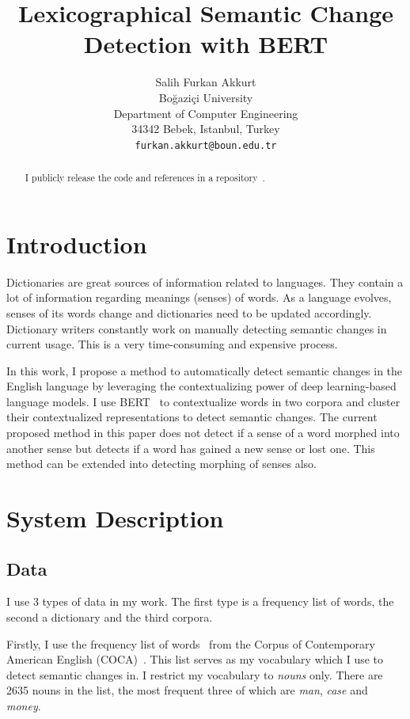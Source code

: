 \documentclass[11pt]{article}
\title{Lexicographical Semantic Change Detection with BERT}
\author{Salih Furkan Akkurt \\
  Boğaziçi University \\
  Department of Computer Engineering \\
  34342 Bebek, Istanbul, Turkey \\
  {\tt furkan.akkurt@boun.edu.tr}
}
\date{}
\begin{document}
\maketitle
\begin{abstract}
  I publicly release the code and references in a repository~\cite{akkurt-2023-58t-app-repo}.
\end{abstract}

\section{Introduction}

Dictionaries are great sources of information related to languages.
They contain a lot of information regarding meanings (senses) of words.
As a language evolves, senses of its words change and dictionaries need to be updated accordingly.
Dictionary writers constantly work on manually detecting semantic changes in current usage.
This is a very time-consuming and expensive process.

In this work, I propose a method to automatically detect semantic changes in the English language by leveraging the contextualizing power of deep learning-based language models.
I use BERT~\cite{devlin-etal-2019-bert} to contextualize words in two corpora and cluster their contextualized representations to detect semantic changes.
The current proposed method in this paper does not detect if a sense of a word morphed into another sense but detects if a word has gained a new sense or lost one.
This method can be extended into detecting morphing of senses also.


\section{System Description}

\subsection{Data}

I use 3 types of data in my work.
The first type is a frequency list of words, the second a dictionary and the third corpora.

Firstly, I use the frequency list of words~\cite{word-freq-2023-coca} from the Corpus of Contemporary American English (COCA)~\cite{english-corpora-2008-coca}.
This list serves as my vocabulary which I use to detect semantic changes in.
I restrict my vocabulary to \textit{nouns} only.
There are 2635 nouns in the list, the most frequent three of which are \textit{man}, \textit{case} and \textit{money}.
\end{document}
